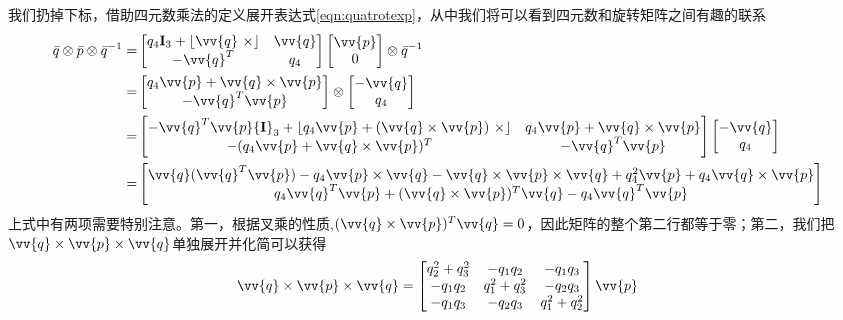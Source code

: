 \documentclass[11pt]{article}
\begin{document}
我们扔掉下标，借助四元数乘法的定义展开表达式\ref{eqn:quatrotexp}，从中我们将可以看到四元数和旋转矩阵之间有趣的联系
\begin{align*}
\bar{q} \otimes \bar{p} \otimes \bar{q}^{-1} 
= & 
\begin{bmatrix}
q_4\mathbf{I}_3+\lfloor \vv{q} \ \times \rfloor   & \vv{q} \\
-\vv{q}^T & q_4  
\end{bmatrix} 
\begin{bmatrix}
\vv{p}\\
0
\end{bmatrix}\otimes \bar{q}^{-1}
\\
= &
\begin{bmatrix}
q_4\vv{p} + \vv{q}\times\vv{p} \\
-\vv{q}^T\vv{p}
\end{bmatrix}
\otimes
\begin{bmatrix}
-\vv{q}\\
q_4
\end{bmatrix}
\\
= &
\begin{bmatrix}
-\vv{q}^T\vv{p}{\bf I}_3 + \lfloor q_4\vv{p}+(\vv{q}\times\vv{p}) \ \times \rfloor &
q_4\vv{p} + \vv{q}\times\vv{p} \\
-(q_4\vv{p}+\vv{q}\times\vv{p})^T &
-\vv{q}^T\vv{p}
\end{bmatrix}
\begin{bmatrix}
-\vv{q}\\
q_4
\end{bmatrix}
\\
= &
\begin{bmatrix}
\vv{q}(\vv{q}^T\vv{p}) - q_4\vv{p}\times\vv{q} - \vv{q}\times\vv{p}\times\vv{q}+q_4^2\vv{p}+q_4\vv{q}\times\vv{p}\\
q_4\vv{q}^T\vv{p}+(\vv{q}\times\vv{p})^T\vv{q}-q_4\vv{q}^T\vv{p}
\end{bmatrix}
\end{align*}
上式中有两项需要特别注意。第一，根据叉乘的性质,$(\vv{q}\times\vv{p})^T\vv{q} = 0$，因此矩阵的整个第二行都等于零；第二，我们把$\vv{q}\times\vv{p}\times\vv{q}$单独展开并化简可以获得
$$
\vv{q}\times\vv{p}\times\vv{q} = 
\begin{bmatrix}
q_2^2+q_3^2	&	-q_1q_2		&	-q_1q_3	\\
-q_1q_2		&	q_1^2+q_3^2	&	-q_2q_3	\\
-q_1q_3		&	-q_2q_3		&	q_1^2+q_2^2
\end{bmatrix}\vv{p}
$$
\end{document}
